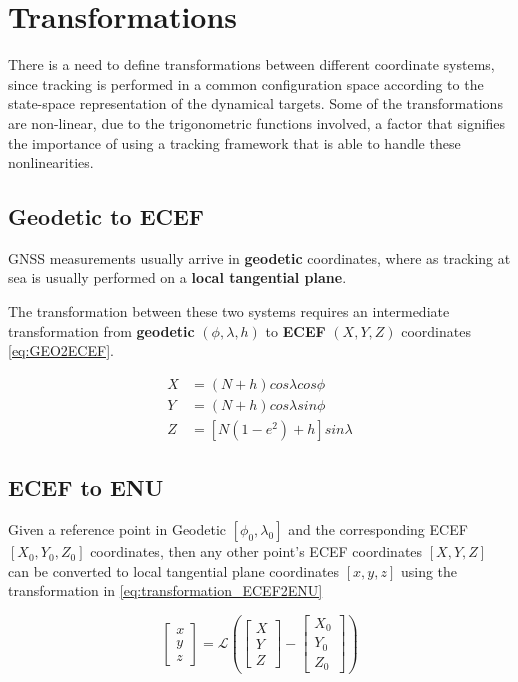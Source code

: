 \section{Transformations}

There is a need to define transformations between different coordinate systems, since tracking is performed in a common configuration space according to the state-space representation of the dynamical targets. Some of the transformations are non-linear, due to the trigonometric functions involved, a factor that signifies the importance of using a tracking framework that is able to handle these nonlinearities.

\subsection{Geodetic to ECEF}

GNSS measurements usually arrive in  \textbf{geodetic} coordinates, where as tracking at sea is usually performed on a \textbf{local tangential plane}.


The transformation between these two systems requires an intermediate transformation from \textbf{geodetic} $(\phi,\lambda,h)$ to \textbf{ECEF}   $(X,Y,Z)$ coordinates \ref{eq:GEO2ECEF}.

\begin{equation} \label{eq:GEO2ECEF}
	\begin{aligned}
			X &=(N+h)cos\lambda cos\phi \\
			Y &= (N+h)cos\lambda sin\phi \\
			Z &= [N(1-e^2)+h] sin\lambda	
	\end{aligned}
\end{equation}


\subsection{ECEF to ENU}



Given a reference point in Geodetic $[\phi_0,\lambda_0]$ and the corresponding ECEF $[X_0,Y_0,Z_0]$ coordinates, then any other point's ECEF coordinates $[X,Y,Z]$ can be converted to local tangential plane coordinates $[x,y,z]$ using the transformation in \ref{eq:transformation_ECEF2ENU}


\begin{equation} \label{eq:transformation_ECEF2ENU}
	\begin{bmatrix}
		x\\
		y\\
		z
	\end{bmatrix}= \mathcal{L}\left(\begin{bmatrix}
		X\\
		Y\\
		Z
	\end{bmatrix} - \begin{bmatrix}
		X_0\\
		Y_0\\
		Z_0
	\end{bmatrix}\right)
\end{equation}


